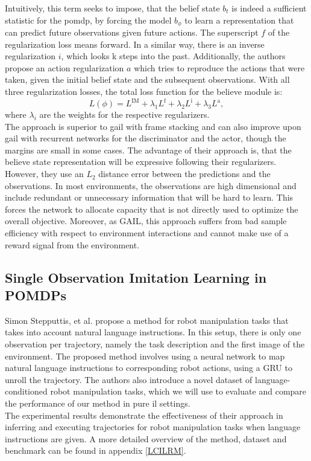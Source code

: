Intuitively, this term seeks to impose, that the belief state $b_t$ is indeed a sufficient statistic for the 
\ac{pomdp}, by forcing the model $b_{\phi}$ to learn a representation that can predict future observations given future actions. The superscript $f$ of the regularization loss means forward. 
In a similar way, there is an inverse regularization $i$, which looks k steps into the past. Additionally, the authors propose an action regularization $a$ which tries to reproduce the actions that were 
taken, given the initial belief state and the subsequent observations. With all three regularization losses, the total loss function for the believe module is:
\begin{equation}
    L(\phi) = L^\text{IM} + \lambda_1 L^\text{f} + \lambda_2 L^\text{i} + \lambda_3 L^\text{a},
\end{equation}
where $\lambda_i$ are the weights for the respective regularizers. \\
The approach is superior to \ac{gail} with frame stacking and can also improve upon \ac{gail} with recurrent networks for the discriminator and the actor, though the margins are small in some cases. The advantage 
of their approach is, that the believe state representation will be expressive following their regularizers. However, they use an $L_2$ distance error between the predictions and the observations. In most environments, 
the observations are high dimensional and include redundant or unnecessary information that will be hard to learn. This forces the network to allocate capacity that is not directly used to 
optimize the overall objective. Moreover, as GAIL, this approach suffers from bad sample efficiency with respect to environment interactions and cannot make use of a reward signal from the environment. 

\subsection{Single Observation Imitation Learning in POMDPs}
Simon Stepputtis, et al. \cite{stepputtis2020languageconditioned} propose a method for robot manipulation tasks that takes 
into account natural language instructions. 
In this setup, there is only one observation per trajectory, namely the task description and the first image of the environment.
The proposed method involves using a neural network to map natural language instructions to 
corresponding robot actions, using a GRU to unroll the trajectory. The authors also introduce a novel dataset of language-conditioned robot manipulation tasks, which we will use to evaluate 
and compare the performance of our method in pure \ac{il} settings.\\ 
The experimental results demonstrate the effectiveness of their approach in inferring and executing trajectories for robot manipulation 
tasks when language instructions are given. A more detailed overview of the method, dataset and benchmark can be found in appendix \ref{LCILRM}.\\


